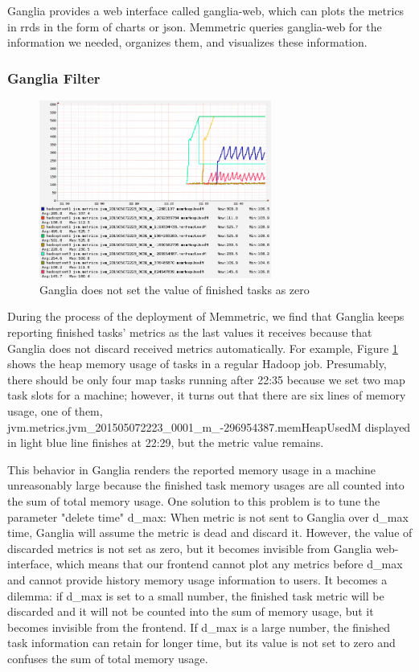 Ganglia provides a web interface called ganglia-web, which can plots the metrics in rrds in the form of charts or json. Memmetric queries ganglia-web for the information we needed, organizes them, and visualizes these information. 

\subsubsection{Ganglia Filter}

\begin{figure}[ht]
  \centering
    \includegraphics[width=3.0in]{image/ganglia_finished_tasks.png}
    \caption{Ganglia does not set the value of finished tasks as zero}
    \label{ref:gangliah_bug}
\end{figure}

During the process of the deployment of Memmetric, we find that Ganglia keeps reporting finished tasks' metrics as the last values it receives because that Ganglia does not discard received metrics automatically. For example, Figure \ref{ref:gangliah_bug} shows the heap memory usage of tasks in a regular Hadoop job. Presumably, there should be only four map tasks running after 22:35 because we set two map task slots for a machine; however, it turns out that there are six lines of memory usage, one of them, jvm.metrics.jvm\_201505072223\_0001\_m\_-296954387.memHeapUsedM displayed in light blue line finishes at 22:29, but the metric value remains.

This behavior in Ganglia renders the reported memory usage in a machine unreasonably large because the finished task memory usages are all counted into the sum of total memory usage. One solution to this problem is to tune the parameter "delete time" d\_max: When metric is not sent to Ganglia over d\_max time, Ganglia will assume the metric is dead and discard it. However, the value of discarded metrics is not set as zero, but it becomes invisible from Ganglia web-interface, which means that our frontend cannot plot any metrics before d\_max and cannot provide history memory usage information to users. It becomes a dilemma: if d\_max is set to a small number, the finished task metric will be discarded and it will not be counted into the sum of memory usage, but it becomes invisible from the frontend. If d\_max is a large number, the finished task information can retain for longer time, but its value is not set to zero and confuses the sum of total memory usage.

